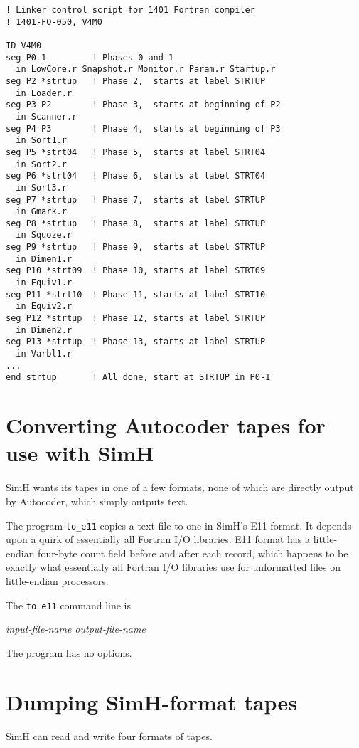 \documentclass[12pt,twoside]{article}
\begin{document}
{\tt\begin{verbatim}
! Linker control script for 1401 Fortran compiler
! 1401-FO-050, V4M0

ID V4M0
seg P0-1         ! Phases 0 and 1
  in LowCore.r Snapshot.r Monitor.r Param.r Startup.r
seg P2 *strtup   ! Phase 2,  starts at label STRTUP
  in Loader.r
seg P3 P2        ! Phase 3,  starts at beginning of P2
  in Scanner.r
seg P4 P3        ! Phase 4,  starts at beginning of P3
  in Sort1.r
seg P5 *strt04   ! Phase 5,  starts at label STRT04
  in Sort2.r
seg P6 *strt04   ! Phase 6,  starts at label STRT04
  in Sort3.r
seg P7 *strtup   ! Phase 7,  starts at label STRTUP
  in Gmark.r
seg P8 *strtup   ! Phase 8,  starts at label STRTUP
  in Squoze.r
seg P9 *strtup   ! Phase 9,  starts at label STRTUP
  in Dimen1.r
seg P10 *strt09  ! Phase 10, starts at label STRT09
  in Equiv1.r
seg P11 *strt10  ! Phase 11, starts at label STRT10
  in Equiv2.r
seg P12 *strtup  ! Phase 12, starts at label STRTUP
  in Dimen2.r
seg P13 *strtup  ! Phase 13, starts at label STRTUP
  in Varbl1.r
...
end strtup       ! All done, start at STRTUP in P0-1
\end{verbatim}}

\section{Converting Autocoder tapes for use with SimH}

SimH wants its tapes in one of a few formats, none of which are directly
output by Autocoder, which simply outputs text.

The program {\tt to\_e11} copies a text file to one in SimH's E11
format.  It depends upon a quirk of essentially all Fortran I/O
libraries:  E11 format has a little-endian four-byte count field before
and after each record, which happens to be exactly what essentially all
Fortran I/O libraries use for unformatted files on little-endian
processors.

The {\tt to\_e11} command line is

\hspace*{0.25in}{\tt to\_e11} \emph{input-file-name output-file-name}

The program has no options.

\section{Dumping SimH-format tapes}

SimH can read and write four formats of tapes.
\end{document}
